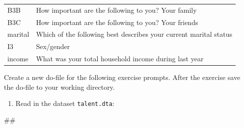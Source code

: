 \documentclass[
]{book}
\newenvironment{Shaded}{\begin{snugshade}}{\end{snugshade}}
\newcommand{\NormalTok}[1]{#1}
\providecommand{\tightlist}{%
  \setlength{\itemsep}{0pt}\setlength{\parskip}{0pt}}
\begin{document}
\begin{longtable}[]{@{}ll@{}}
\begin{minipage}[t]{0.17\columnwidth}\raggedright
B3B\strut
\end{minipage} & \begin{minipage}[t]{0.77\columnwidth}\raggedright
How important are the following to you? Your family\strut
\end{minipage}\tabularnewline
\begin{minipage}[t]{0.17\columnwidth}\raggedright
B3C\strut
\end{minipage} & \begin{minipage}[t]{0.77\columnwidth}\raggedright
How important are the following to you? Your friends\strut
\end{minipage}\tabularnewline
\begin{minipage}[t]{0.17\columnwidth}\raggedright
marital\strut
\end{minipage} & \begin{minipage}[t]{0.77\columnwidth}\raggedright
Which of the following best describes your current marital status\strut
\end{minipage}\tabularnewline
\begin{minipage}[t]{0.17\columnwidth}\raggedright
I3\strut
\end{minipage} & \begin{minipage}[t]{0.77\columnwidth}\raggedright
Sex/gender\strut
\end{minipage}\tabularnewline
\begin{minipage}[t]{0.17\columnwidth}\raggedright
income\strut
\end{minipage} & \begin{minipage}[t]{0.77\columnwidth}\raggedright
What was your total household income during last year\strut
\end{minipage}\tabularnewline
\bottomrule
\end{longtable}

Create a new do-file for the following exercise prompts. After the exercise save the do-file to your working directory.

\begin{enumerate}
\def\labelenumi{\arabic{enumi}.}
\tightlist
\item
  Read in the dataset \texttt{talent.dta}:
\end{enumerate}

\begin{Shaded}
\begin{Highlighting}[]
\NormalTok{\#\#}
\end{Highlighting}
\end{Shaded}
\end{document}
